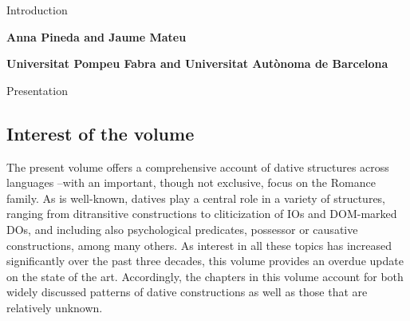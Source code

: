 \documentclass[output=paper,modfonts,nonflat]{langsci/langscibook}
\author{\affiliation{}\orcid{}}
\title{}
\begin{document}
\maketitle 


\begin{styleTitleA}
Introduction
\end{styleTitleA}

\begin{styleBodyA}\sffamily\bfseries
Anna Pineda and Jaume Mateu
\end{styleBodyA}

\begin{styleBodyA}\sffamily\bfseries
Universitat Pompeu Fabra and Universitat Autònoma de Barcelona
\end{styleBodyA}

\begin{listWWviiiNumiileveli}
\item \begin{stylelsSectioni}
Presentation\\\end{stylelsSectioni}

\begin{listWWviiiNumiilevelii}
\item \subsection{Interest of the volume}
\end{listWWviiiNumiilevelii}
\end{listWWviiiNumiileveli}
\begin{styleBodyA}
The present volume offers a comprehensive account of dative structures across languages –with an important, though not exclusive, focus on the Romance family. As is well-known, datives play a central role in a variety of structures, ranging from ditransitive constructions to cliticization of IOs and DOM-marked DOs, and including also psychological predicates, possessor or causative constructions, among many others. As interest in all these topics has increased significantly over the past three decades, this volume provides an overdue update on the state of the art. Accordingly, the chapters in this volume account for both widely discussed patterns of dative constructions as well as those that are relatively unknown. 
\end{styleBodyA}
\end{document}
